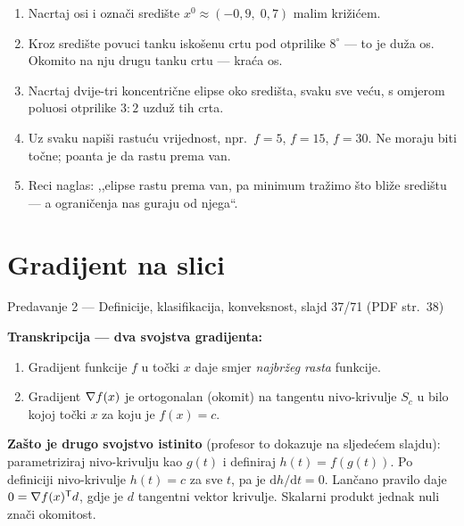 \begin{ploca}
\begin{enumerate}[leftmargin=*]
  \item Nacrtaj osi i označi središte $x^{0} \approx (-0{,}9,\; 0{,}7)$ malim križićem.
  \item Kroz središte povuci tanku iskošenu crtu pod otprilike $8^\circ$ --- to je
        duža os. Okomito na nju drugu tanku crtu --- kraća os.
  \item Nacrtaj dvije-tri koncentrične elipse oko središta, svaku sve veću, s
        omjerom poluosi otprilike $3{:}2$ uzduž tih crta.
  \item Uz svaku napiši rastuću vrijednost, npr.\ $f = 5$, $f = 15$, $f = 30$.
        Ne moraju biti točne; poanta je da rastu prema van.
  \item Reci naglas: ,,elipse rastu prema van, pa minimum tražimo što bliže
        središtu --- a ograničenja nas guraju od njega``.
\end{enumerate}
\end{ploca}

\section{Gradijent na slici}
\label{sec:gradijent-na-slici}

\begin{izvor}{Predavanje 2 --- Definicije, klasifikacija, konveksnost, slajd 37/71 (PDF str.~38)}

\textbf{Transkripcija --- dva svojstva gradijenta:}
\begin{enumerate}[nosep,leftmargin=*]
  \item Gradijent funkcije $f$ u točki $x$ daje smjer \emph{najbržeg rasta} funkcije.
  \item Gradijent $\nabla f(x)$ je ortogonalan (okomit) na tangentu nivo-krivulje
        $S_c$ u bilo kojoj točki $x$ za koju je $f(x) = c$.
\end{enumerate}

\textbf{Zašto je drugo svojstvo istinito} (profesor to dokazuje na sljedećem
slajdu): parametriziraj nivo-krivulju kao $g(t)$ i definiraj $h(t) = f(g(t))$.
Po definiciji nivo-krivulje $h(t) = c$ za sve $t$, pa je $\mathrm{d}h/\mathrm{d}t = 0$.
Lančano pravilo daje $0 = \nabla f(x)^{\mathsf{T}} d$, gdje je $d$ tangentni vektor
krivulje. Skalarni produkt jednak nuli znači okomitost.
\end{izvor}

